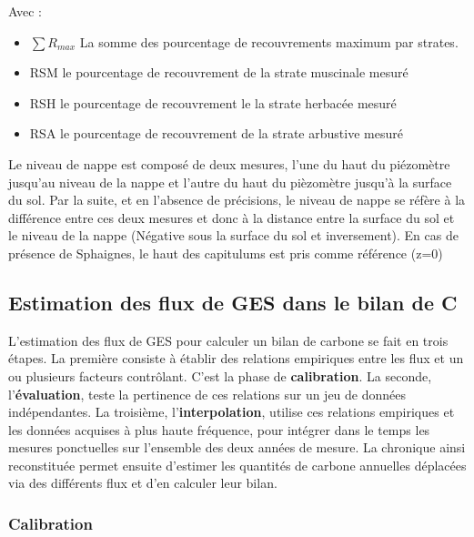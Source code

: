 Avec :
\begin{itemize}
\item $\sum R_{max}$ La somme des pourcentage de recouvrements maximum par strates.
\item RSM le pourcentage de recouvrement de la strate muscinale mesuré
\item RSH le pourcentage de recouvrement le la strate herbacée mesuré
\item RSA le pourcentage de recouvrement de la strate arbustive mesuré
\end{itemize}

Le niveau de nappe est composé de deux mesures, l'une du haut du piézomètre jusqu'au niveau de la nappe et l'autre du haut du pièzomètre jusqu'à la surface du sol. 
Par la suite, et en l'absence de précisions, le niveau de nappe se réfère à la différence entre ces deux mesures et donc à la distance entre la surface du sol et le niveau de la nappe (Négative sous la surface du sol et inversement).
En cas de présence de Sphaignes, le haut des capitulums est pris comme référence (z=0)

\subsection{Estimation des flux de GES dans le bilan de C}

L'estimation des flux de GES pour calculer un bilan de carbone se fait en trois étapes.
La première consiste à établir des relations empiriques entre les flux et un ou plusieurs facteurs contrôlant.
C'est la phase de \textbf{calibration}.
La seconde, l'\textbf{évaluation}, teste la pertinence de ces relations sur un jeu de données indépendantes.
La troisième, l'\textbf{interpolation}, utilise ces relations empiriques et les données acquises à plus haute fréquence, pour intégrer dans le temps les mesures ponctuelles sur l'ensemble des deux années de mesure. 
La chronique ainsi reconstituée permet ensuite d'estimer les quantités de carbone annuelles déplacées via des différents flux et d'en calculer leur bilan.

\subsubsection{Calibration}

